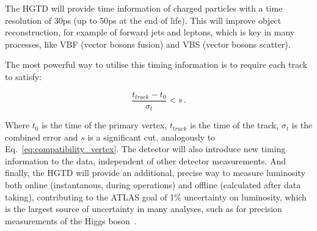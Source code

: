 
The HGTD will provide time information of charged particles with a time resolution of 30ps (up to 50ps at the end of life). %
This will improve object reconstruction, for example of forward jets and leptons, which is key in many processes, like VBF (vector bosons fusion) and VBS (vector bosons scatter). %

The most powerful way to utilise this timing information is to require each track to satisfy:

\begin{equation}
    \frac{t_{track}-t_0}{\sigma_t} < s \,.
\end{equation}

Where \(t_0\) is the time of the primary vertex, \(t_{track}\) is the time of the track, \(\sigma_t\) is the combined error and \(s\) is a significant cut, analogously to Eq.~\ref{eq:compatibility_vertex}. %
The detector will also introduce new timing information to the data, independent of other detector measurements. And finally, the HGTD will provide an additional, precise way to measure luminosity both online (instantanous, during operations) and offline (calculated after data taking), contributing to the ATLAS goal of 1\% uncertainty on luminosity, which is the largest source of uncertainty in many analyses, such as for precision measurements of the Higgs boson~\cite{CERN-LHCC-2020-007}.



